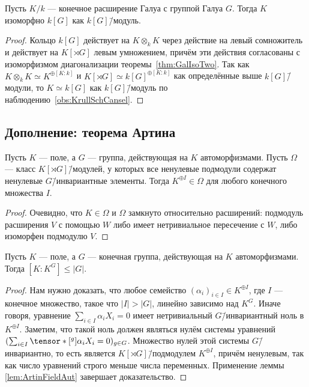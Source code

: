 \documentclass[
	extrafontsizes,
	11pt,
	hyphens,
]{memoir}
\begin{document}
\begin{theorem}
Пусть \(K/k\) --- конечное расширение Галуа с группой Галуа \(G\). Тогда \(K\) изоморфно \(k[G]\) как \(k[G]\)\=/модуль.
\end{theorem}

\begin{proof}
Кольцо \(k[G]\) действует на \(K \otimes_k K\) через действие на левый сомножитель и действует на \(K[\rtimes G]\) левым умножением,
причём эти действия согласованы с изоморфизмом диагонализации теоремы~\ref{thm:GalIsoTwo}.
Так как \(K \otimes_k K \simeq K^{\oplus [K : k]}\) и \(K[\rtimes G] \simeq k[G]^{\oplus [K : k]}\) как определённые выше \(k[G]\)\=/модули,
то \(K \simeq k[G]\) как \(k[G]\)\=/модуль по наблюдению~\ref{obs:KrullSchCansel}.
\end{proof}

\subsection{Дополнение: теорема Артина}

\begin{lemma}
\label{lem:ArtinFieldAut}
Пусть \(K\) --- поле, а \(G\) --- группа, действующая на \(K\) автоморфизмами.
Пусть \(\Omega\) --- класс \(K[\rtimes G]\)\=/модулей, у которых все ненулевые подмодули содержат ненулевые \(G\)\=/инвариантные элементы.
Тогда \(K^{\oplus I} \in \Omega\) для любого конечного множества \(I\).
\end{lemma}

\begin{proof}
Очевидно, что \(K \in \Omega\)
и \(\Omega\) замкнуто относительно расширений: подмодуль расширения \(V\) с помощью \(W\) либо имеет нетривиальное пересечение с \(W\), либо изоморфен подмодулю \(V\).
\end{proof}

\begin{theorem}
Пусть \(K\) --- поле, а \(G\) --- конечная группа, действующая на \(K\) автоморфизмами.
Тогда \([K : K^G] \leq \lvert G \rvert\).
\end{theorem}

\begin{proof}
Нам нужно доказать, что любое семейство \((\alpha_i)_{i \in I} \in K^{\oplus I}\), где \(I\) --- конечное множество, такое что \(\lvert I \rvert > \lvert G \rvert\), линейно зависимо над \(K^G\).
Иначе говоря, уравнение \(\sum_{i \in I} \alpha_i X_i = 0\) имеет нетривиальный \(G\)\=/инвариантный ноль в \(K^{\oplus I}\).
Заметим, что такой ноль должен являться нулём системы уравнений 
\(
(\sum_{i \in I} \tensor*[^g]{{\alpha_i}}{} X_i = 0)_{g \in G}
\).
Множество нулей этой системы \(G\)\=/инвариантно, то есть является \(K[\rtimes G]\)\=/подмодулем \(K^{\oplus I}\), причём ненулевым, так как число уравнений строго меньше числа переменных.
Применение леммы \ref{lem:ArtinFieldAut} завершает доказательство.
\end{proof}
\end{document}
